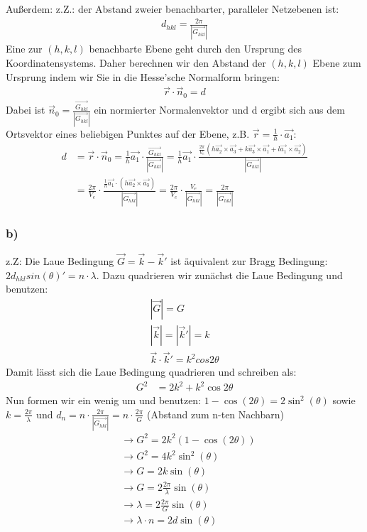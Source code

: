 \documentclass[11pt]{article}
\begin{document}
Außerdem: z.Z.: der Abstand zweier benachbarter, paralleler Netzebenen ist:
\begin{align*}
d_{hkl}=\frac{2\pi}{|\vec{G_{hkl}}|}
\end{align*}
Eine zur $(h,k,l)$ benachbarte Ebene geht durch den Ursprung des Koordinatensystems. Daher berechnen wir den Abstand der $(h,k,l)$ Ebene zum Ursprung indem wir Sie in die Hesse'sche Normalform bringen:
\begin{align*}
\vec{r}\cdot \vec n_0 = d
\end{align*}
Dabei ist $ \vec n_0 = \frac{\vec{G_{hkl}}}{|\vec{G_{hkl}}|}$ ein normierter Normalenvektor und d ergibt sich aus dem Ortsvektor eines beliebigen Punktes auf der Ebene, z.B. $\vec{r}=\frac{1}{h}\cdot\vec{a_1}$:
\begin{align*}
d &= \vec{r}\cdot \vec n_0
= \frac{1}{h}\vec{a_1}\cdot\frac{\vec{G_{hkl}}}{|\vec{G_{hkl}}|}
= \frac{1}{h}\vec{a_1}\cdot\frac{\frac{2\pi}{V_e}(h\vec{a_2}\times\vec{a_3}+k\vec{a_3}\times\vec{a_1}+l\vec{a_1}\times\vec{a_2})}{|\vec{G_{hkl}}|}\\
&= \frac{2\pi}{V_e} \cdot \frac{\frac{1}{h}\vec{a_1}\cdot(h \vec{a_2}\times\vec{a_3})}{|\vec{G_{hkl}}|} =
\frac{2\pi}{V_e} \cdot \frac{V_e}{|\vec{G_{hkl}}|} =\frac{2\pi}{|\vec{G_{hkl}}|}
\end{align*}
\subsubsection*{b)}
z.Z: Die Laue Bedingung $\vec{G} = \vec{k}-\vec{k}'$ ist äquivalent zur Bragg Bedingung: $2d_{hkl}sin(\theta)'=n\cdot\lambda$. Dazu quadrieren wir zunächst die Laue Bedingung und benutzen:
\begin{align*}
|\vec{G}| = G\\
|\vec{k}|=|\vec{k}'|=k\\
\vec{k}\cdot\vec{k}' = k^2cos{2\theta}
\end{align*}
Damit lässt sich die Laue Bedingung quadrieren und schreiben als:
\begin{align*}
G^2 &= 2k^2+k^2\cos{2\theta}
\end{align*}
Nun formen wir ein wenig um und benutzen: $1-\cos(2\theta)=2\sin^2(\theta)$ sowie $k = \frac{2\pi}{\lambda}$ und $d_n=n\cdot\frac{2\pi}{|\vec{G_{hkl}}|}=n\cdot\frac{2\pi}{G}$ (Abstand zum n-ten Nachbarn)
\begin{align*}
&\rightarrow G^2 = 2k^2(1-\cos(2\theta))\\
&\rightarrow G^2 = 4k^2 \sin^2(\theta)\\
&\rightarrow G = 2k \sin(\theta)\\
&\rightarrow G = 2\frac{2\pi}{\lambda}\sin(\theta)\\
&\rightarrow \lambda = 2\frac{2\pi}{G}\sin(\theta)\\
&\rightarrow \lambda \cdot n = 2d\sin(\theta)
\end{align*}
\end{document}
